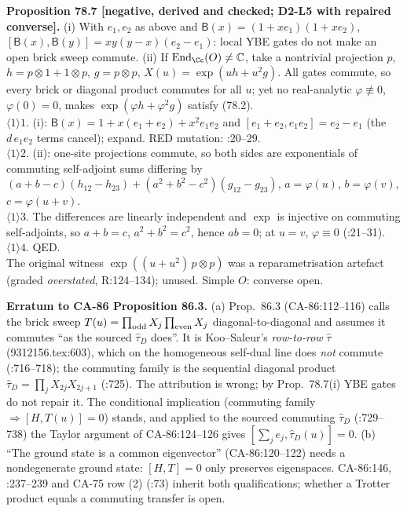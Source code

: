 \textbf{Proposition 78.7 [negative, derived and checked; D2-L5 with repaired converse].} (i) With
\(e_1,e_2\) as above and \(\mathsf B(x)=(1+xe_1)(1+xe_2)\), \([\mathsf B(x),\mathsf
B(y)]=xy(y-x)(e_2-e_1)\): local YBE gates do not make an open brick sweep commute.  (ii) If
\(\operatorname{End}_\Cc(O)\neq\mathbb C\), take a nontrivial projection \(p\),
\(h=p\otimes1+1\otimes p\), \(g=p\otimes p\), \(X(u)=\exp(uh+u^2g)\).  All gates commute, so every
brick or diagonal product commutes for all \(u\); yet no real-analytic \(\varphi\not\equiv0\),
\(\varphi(0)=0\), makes \(\exp(\varphi h+\varphi^2g)\) satisfy (78.2).\\ \(\langle1\rangle1\). (i):
\(\mathsf B(x)=1+x(e_1{+}e_2)+x^2e_1e_2\) and \([e_1{+}e_2,e_1e_2]=e_2-e_1\) (the \(d\,e_1e_2\)
terms cancel); expand.  RED mutation: :20--29.\\ \(\langle1\rangle2\). (ii): one-site
projections commute, so both sides are exponentials of commuting self-adjoint sums differing by
\((a{+}b{-}c)(h_{12}-h_{23})+(a^2{+}b^2{-}c^2) (g_{12}-g_{23})\), \(a=\varphi(u)\),
\(b=\varphi(v)\), \(c=\varphi(u{+}v)\).\\ \(\langle1\rangle3\). The differences are linearly
independent and \(\exp\) is injective on commuting self-adjoints, so \(a+b=c\), \(a^2+b^2=c^2\),
hence \(ab=0\); at \(u=v\), \(\varphi\equiv0\) (:21--31).
\(\langle1\rangle4\). QED.\\ The original witness \(\exp((u+u^2)\,p\otimes p)\) was a
reparametrisation artefact (graded \emph{overstated}, R:124--134); unused.  Simple \(O\): converse
open.

\textbf{Erratum to CA-86 Proposition 86.3.}  (a) Prop.~86.3 (CA-86:112--116) calls the brick sweep
\(T(u)=\prod_{\rm odd}X_j\prod_{\rm even}X_j\) diagonal-to-diagonal and assumes it commutes ``as the sourced
\(\hat\tau_D\) does''.  It is Koo--Saleur's \emph{row-to-row} \(\hat\tau\)
(9312156.tex:603), which on the homogeneous self-dual line does \emph{not} commute (:716--718); the
commuting family is the sequential diagonal product \(\hat\tau_D=\prod_jX_{2j}X_{2j+1}\) (:725). The
attribution is wrong; by Prop.~78.7(i) YBE gates do not repair it.  The conditional implication
(commuting family \(\Rightarrow[H,T(u)]=0\)) stands, and applied to the sourced commuting \(\hat\tau_D\) (:729--738) the Taylor argument of CA-86:124--126 gives \([\sum_je_j,\hat\tau_D(u)]=0\).  (b) ``The ground state is a
common eigenvector'' (CA-86:120--122) needs a nondegenerate ground state: \([H,T]=0\) only preserves
eigenspaces.  CA-86:146, :237--239 and CA-75 row (2) (:73) inherit both qualifications; whether a
Trotter product equals a commuting transfer is open.

